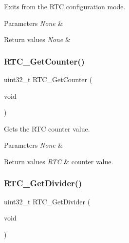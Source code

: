 Exits from the R\+TC configuration mode. 


\begin{DoxyParams}{Parameters}
{\em None} & \\
\hline
\end{DoxyParams}

\begin{DoxyRetVals}{Return values}
{\em None} & \\
\hline
\end{DoxyRetVals}
\mbox{\label{group___r_t_c___exported___functions_ga6edb19a0ad8414a40610341121c5ea6c}} 
\subsubsection{\texorpdfstring{RTC\_GetCounter()}{RTC\_GetCounter()}}
{\footnotesize\ttfamily uint32\+\_\+t R\+T\+C\+\_\+\+Get\+Counter (\begin{DoxyParamCaption}\item[{void}]{ }\end{DoxyParamCaption})}



Gets the R\+TC counter value. 


\begin{DoxyParams}{Parameters}
{\em None} & \\
\hline
\end{DoxyParams}

\begin{DoxyRetVals}{Return values}
{\em R\+TC} & counter value. \\
\hline
\end{DoxyRetVals}
\mbox{\label{group___r_t_c___exported___functions_gaa4f00e0469fedcf6cbf23760e6d801ed}} 
\subsubsection{\texorpdfstring{RTC\_GetDivider()}{RTC\_GetDivider()}}
{\footnotesize\ttfamily uint32\+\_\+t R\+T\+C\+\_\+\+Get\+Divider (\begin{DoxyParamCaption}\item[{void}]{ }\end{DoxyParamCaption})}



